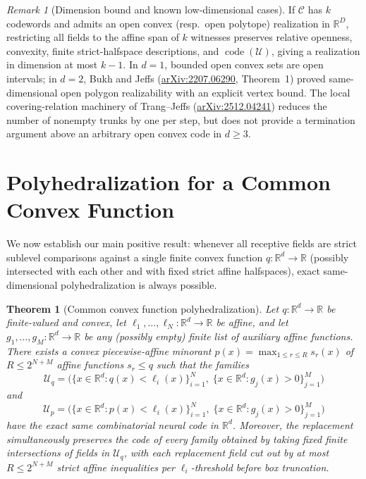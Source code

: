 \documentclass[11pt]{article}
\theoremstyle{plain}
\newtheorem{theorem}{Theorem}
\theoremstyle{definition}
\theoremstyle{remark}
\newtheorem{remark}{Remark}
\DeclareMathOperator{\code}{code}
\begin{document}
\begin{remark}[Dimension bound and known low-dimensional cases]
If $\mathcal{C}$ has $k$ codewords and admits an open convex (resp.\ open polytope) realization in $\mathbb{R}^D$, restricting all fields to the affine span of $k$ witnesses preserves relative openness, convexity, finite strict-halfspace descriptions, and $\code(\mathcal{U})$, giving a realization in dimension at most $k - 1$. In $d = 1$, bounded open convex sets are open intervals; in $d = 2$, Bukh and Jeffs (\href{https://arxiv.org/abs/2207.06290}{arXiv:2207.06290}, Theorem~1) proved same-dimensional open polygon realizability with an explicit vertex bound. The local covering-relation machinery of Trang--Jeffs (\href{https://arxiv.org/abs/2512.04241}{arXiv:2512.04241}) reduces the number of nonempty trunks by one per step, but does not provide a termination argument above an arbitrary open convex code in $d \ge 3$.
\end{remark}

\section{Polyhedralization for a Common Convex Function}

We now establish our main positive result: whenever all receptive fields are strict sublevel comparisons against a single finite convex function $q : \mathbb{R}^d \to \mathbb{R}$ (possibly intersected with each other and with fixed strict affine halfspaces), exact same-dimensional polyhedralization is always possible.

\begin{theorem}[Common convex function polyhedralization]\label{thm:common-q}
Let $q : \mathbb{R}^d \to \mathbb{R}$ be finite-valued and convex, let $\ell_1, \dots, \ell_N : \mathbb{R}^d \to \mathbb{R}$ be affine, and let $g_1, \dots, g_M : \mathbb{R}^d \to \mathbb{R}$ be any (possibly empty) finite list of auxiliary affine functions. There exists a convex piecewise-affine minorant $p(x) = \max_{1 \le r \le R} s_r(x)$ of $R \le 2^{N+M}$ affine functions $s_r \le q$ such that the families
\[
\mathcal{U}_q = \bigl(\{x \in \mathbb{R}^d : q(x) < \ell_i(x)\}_{i=1}^N,\; \{x \in \mathbb{R}^d : g_j(x) > 0\}_{j=1}^M\bigr)
\]
and
\[
\mathcal{U}_p = \bigl(\{x \in \mathbb{R}^d : p(x) < \ell_i(x)\}_{i=1}^N,\; \{x \in \mathbb{R}^d : g_j(x) > 0\}_{j=1}^M\bigr)
\]
have the exact same combinatorial neural code in $\mathbb{R}^d$. Moreover, the replacement simultaneously preserves the code of every family obtained by taking fixed finite intersections of fields in $\mathcal{U}_q$, with each replacement field cut out by at most $R \le 2^{N+M}$ strict affine inequalities per $\ell_i$-threshold before box truncation.
\end{theorem}
\end{document}
